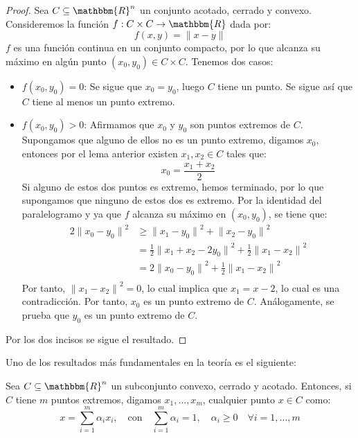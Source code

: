 \documentclass[12pt]{report}
\theoremstyle{largebreak}
\newcommand\norm[1]{\ensuremath{\|#1\|}}
\newcommand\cf[3]{\ensuremath{#1:#2\rightarrow#3}}
\newcommand{\bbm}[1]{\ensuremath{\mathbbm{#1}}}
\begin{document}
\begin{proof}
    Sea $C\subseteq\bbm{R}^n$ un conjunto acotado, cerrado y convexo. Consideremos la función $\cf{f}{C\times C}{\bbm{R}}$ dada por:
    \begin{equation*}
        f(x,y)=\norm{x-y}
    \end{equation*}
    $f$ es una función continua en un conjunto compacto, por lo que alcanza su máximo en algún punto $(x_0,y_0)\in C\times C$. Tenemos dos casos:
    \begin{itemize}
        \item $f(x_0,y_0)=0$: Se sigue que $x_0=y_0$, luego $C$ tiene un punto. Se sigue así que $C$ tiene al menos un punto extremo.
        \item $f(x_0,y_0)>0$: Afirmamos que $x_0$ y $y_0$ son puntos extremos de $C$. Supongamos que alguno de ellos no es un punto extremo, digamos $x_0$, entonces por el lema anterior existen $x_1,x_2\in C$ tales que:
        \begin{equation*}
            x_0=\frac{x_1+x_2}{2}
        \end{equation*}
        Si alguno de estos dos puntos es extremo, hemos terminado, por lo que supongamos que ninguno de estos dos es extremo. Por la identidad del paralelogramo y ya que $f$ alcanza su máximo en $(x_0,y_0)$, se tiene que:
        \begin{equation*}
            \begin{split}
                2\norm{x_0-y_0}^2&\geq\norm{x_1-y_0}^2+\norm{x_2-y_0}^2\\
                &=\frac{1}{2}\norm{x_1+x_2-2y_0}^2+\frac{1}{2}\norm{x_1-x_2}^2\\
                &=2\norm{x_0-y_0}^2+\frac{1}{2}\norm{x_1-x_2}^2\\
            \end{split}
        \end{equation*}
        Por tanto, $\norm{x_1-x_2}^2=0$, lo cual implica que $x_1=x-2$, lo cual es una contradicción. Por tanto, $x_0$ es un punto extremo de $C$. Análogamente, se prueba que $y_0$ es un punto extremo de $C$.
    \end{itemize}
    Por los dos incisos se sigue el resultado.
\end{proof}

Uno de los resultados más fundamentales en la teoría es el siguiente:

\begin{theor}
    Sea $C\subseteq\bbm{R}^n$ un subconjunto convexo, cerrado y acotado. Entonces, si $C$ tiene $m$ puntos extremos, digamos $x_1,\dots,x_m$, cualquier punto $x\in C$ como:
    \begin{equation*}
        x=\sum_{i=1}^{m}\alpha_ix_i,\quad\text{con}\quad\sum_{i=1}^{m}\alpha_i=1,\quad\alpha_i\geq0\quad\forall i=1,\dots,m
    \end{equation*} 
\end{theor}
\end{document}

